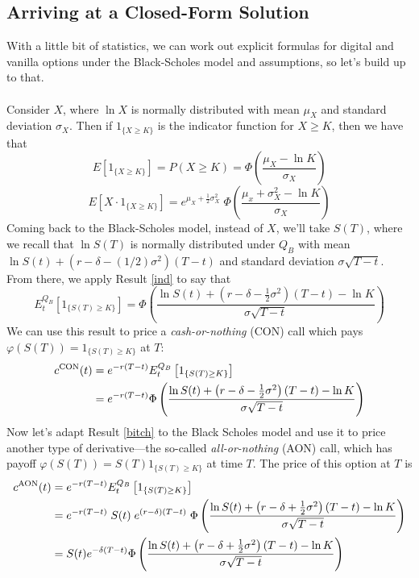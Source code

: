 \documentclass[12pt]{article}
\theoremstyle{plain}
\theoremstyle{definition}
\theoremstyle{remark}
\begin{document}
\newpage

\subsection{Arriving at a Closed-Form Solution}

With a little bit of statistics, we can work out explicit formulas
for digital and vanilla options under the Black-Scholes model and 
assumptions, so let's build up to that.
\\
\\
Consider $X$, where $\ln X$ is normally distributed with mean $\mu_X$
and standard deviation $\sigma_X$.  Then if $1_{\{X\geq K\}}$ is the
indicator function for $X \geq K$, then we have that
\begin{equation}
   \label{ind}
   E\left[1_{\{X\geq K\}}\right] = P(X\geq K) = \Phi \left(
      \frac{\mu_X - \ln K }{\sigma_X}\right) 
\end{equation}
\begin{equation}
   \label{bitch}
    E\left[X \cdot 1_{\{X\geq K\}}\right] = 
      e^{\mu_X + \frac{1}{2}\sigma_X^2} \; \Phi\left(\frac{\mu_x + 
      \sigma_X^2 - \ln K}{\sigma_X} \right) 
\end{equation}
Coming back to the Black-Scholes model, instead of $X$, we'll take
$S(T)$, where we recall that $\ln S(T)$ is normally distributed under 
$Q_B$ with mean
$\ln S(t) + ( r - \delta - (1/2)\sigma^2) (T-t)$
and standard deviation $\sigma \sqrt{T-t}$. From there, we apply
Result \ref{ind} to say that
   \[ E_t^{Q_B}\left[ 1_{\{S(T)\geq K\}}\right] = 
      \Phi\left( \frac{\ln S(t) + \left(r-\delta - \frac{1}{2} \sigma^2
      \right)(T-t) - \ln K }{\sigma \sqrt{T-t}}\right) \]
We can use this result to price a \emph{cash-or-nothing} (CON) call
which pays $\varphi(S(T)) = 1_{\{S(T)\geq K\}}$ at $T$:
\begin{align}
   \label{con}
   c^{\text{CON}}(t) &= e^{-r(T-t)} 
      E_t^{Q_B}\left[ 1_{\{S(T)\geq K\}}\right]
   \notag\\
   &=  e^{-r(T-t)} 
      \Phi\left( \frac{\ln S(t) + \left(r-\delta - \frac{1}{2} \sigma^2
      \right)(T-t) - \ln K }{\sigma \sqrt{T-t}}\right) 
\end{align}
Now let's adapt Result \ref{bitch} to the Black Scholes model and use
it to price another type of derivative---the so-called 
\emph{all-or-nothing} (AON) call, which has payoff $\varphi(S(T)) = 
S(T) 1_{\{S(T) \geq K\}}$ at time $T$. The price of this option at
$T$ is 
\begin{align}
   \label{aon}
      c^{\text{AON}}(t) &= e^{-r(T-t)} 
      E_t^{Q_B}\left[ 1_{\{S(T)\geq K\}}\right]
      \notag\\
      &= e^{-r(T-t)}  \; S(t) \; e^{(r-\delta)(T-t)} \;
      \Phi\left(\frac{\ln S(t) + \left(r-\delta + \frac{1}{2}\sigma^2
      \right)(T-t) - \ln K}{\sigma \sqrt{T-t}}\right)
      \notag\\
      &= S(t) e^{-\delta (T-t)} \Phi\left(\frac{\ln S(t) + 
	 \left(r-\delta + \frac{1}{2}\sigma^2
	 \right)(T-t) - \ln K}{\sigma \sqrt{T-t}}\right)
\end{align}
\end{document}
